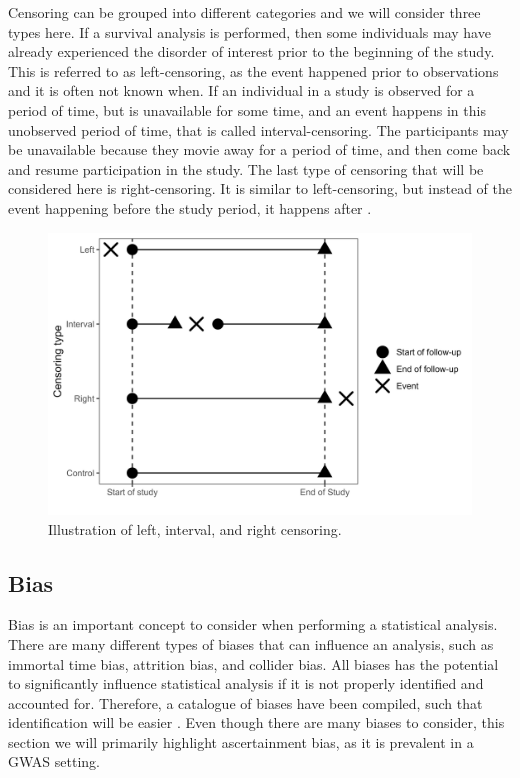 Censoring can be grouped into different categories and we will consider three types here. If a survival analysis is performed, then some individuals may have already experienced the disorder of interest prior to the beginning of the study. This is referred to as left-censoring, as the event happened prior to observations and it is often not known when. If an individual in a study is observed for a period of time, but is unavailable for some time, and an event happens in this unobserved period of time, that is called interval-censoring. The participants may be unavailable because they movie away for a period of time, and then come back and resume participation in the study. The last type of censoring that will be considered here is right-censoring. It is similar to left-censoring, but instead of the event happening before the study period, it happens after \cite{andersen2012statistical}.

\begin{figure}[!h]
	\centering
	\includegraphics[width=\textwidth]{methods/censoring_plot.png}
	\caption{Illustration of left, interval, and right censoring.}
	\label{fig:censoring}
\end{figure}

\subsection{Bias}

Bias is an important concept to consider when performing a statistical analysis. There are many different types of biases that can influence an analysis, such as immortal time bias, attrition bias, and collider bias. All biases has the potential to significantly influence statistical analysis if it is not properly identified and accounted for. Therefore, a catalogue of biases have been compiled, such that identification will be easier \cite{biascatalogue}. Even though there are many biases to consider, this section we will primarily highlight ascertainment bias, as it is prevalent in a GWAS setting. 

